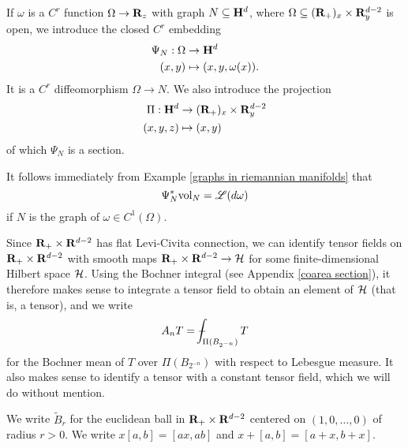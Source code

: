 \begin{notation}\label{hyperbolic line bundle}
If $\omega$ is a $C^r$ function $\Omega \to \mathbf{R}_z$ with graph $N \subseteq \mathbf H^d$, where $\Omega \subseteq (\mathbf{R}_+)_x \times \mathbf{R}^{d - 2}_y$ is open, we introduce the closed $C^r$ embedding
\begin{align*}
    \Psi_N: \Omega &\to \mathbf H^d \\
    (x, y) &\mapsto (x, y, \omega(x)).
\end{align*}
It is a $C^r$ diffeomorphism $\Omega \to N$.
We also introduce the projection 
\begin{align*}
    \Pi: \mathbf H^d &\to (\mathbf{R}_+)_x \times \mathbf{R}^{d - 2}_y\\
    (x, y, z) &\mapsto (x, y)
\end{align*}
of which $\Psi_N$ is a section.
\end{notation}

It follows immediately from Example \ref{graphs in riemannian manifolds} that 
\begin{equation}\label{Lagrangian formula}
\Psi_N^* \mathrm{vol}_N = \mathscr L(d\omega)
\end{equation}
if $N$ is the graph of $\omega \in C^1(\Omega)$.

\begin{notation}
Since $\mathbf{R}_+ \times \mathbf{R}^{d - 2}$ has flat Levi-Civita connection, we can identify tensor fields on $\mathbf{R}_+ \times \mathbf{R}^{d - 2}$ with smooth maps $\mathbf{R}_+ \times \mathbf{R}^{d - 2} \to \mathcal H$ for some finite-dimensional Hilbert space $\mathcal H$.
Using the Bochner integral (see Appendix \ref{coarea section}), it therefore makes sense to integrate a tensor field to obtain an element of $\mathcal H$ (that is, a tensor), and we write
$$A_n T = \dashint_{\Pi(B_{2^{-n}})} T$$
for the Bochner mean of $T$ over $\Pi(B_{2^{-n}})$ with respect to Lebesgue measure.
It also makes sense to identify a tensor with a constant tensor field, which we will do without mention.
\end{notation}

\begin{notation}[miscellany]
We write $\tilde B_r$ for the euclidean ball in $\mathbf{R}_+ \times \mathbf{R}^{d - 2}$ centered on $(1, 0, \dots, 0)$ of radius $r > 0$.
We write $x[a,b] = [ax, ab]$ and $x + [a, b] = [a + x, b + x]$.
\end{notation}

